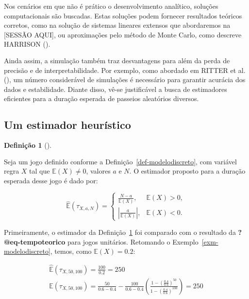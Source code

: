 \documentclass[
  brazilian,
  12pt,
]{article}
\theoremstyle{definition}
\theoremstyle{definition}
\newtheorem{definition}{Definição}[section]
\theoremstyle{remark}
\begin{document}
Nos cenários em que não é prático o desenvolvimento analítico, soluções
computacionais são buscadas. Estas soluções podem fornecer resultados
teóricos corretos, como na solução de sistemas lineares extensos que
abordaremos na {[}SESSÃO AQUI{]}, ou aproximações pelo método de Monte
Carlo, como descreve HARRISON
().

Ainda assim, a simulação também traz desvantagens para além da perda de
precisão e de interpretabilidade. Por exemplo, como abordado em RITTER
et al. (), um número
considerável de simulações é necessário para garantir acurácia dos dados
e estabilidade. Diante disso, vê-se justificável a busca de estimadores
eficientes para a duração esperada de passeios aleatórios diversos.

\subsection{Um estimador heurístico}\label{um-estimador-heuruxedstico}

\begin{definition}[]\protect\hypertarget{def-estimadorsimples}{}\label{def-estimadorsimples}

Seja um jogo definido conforme a Definição~\ref{def-modelodiscreto}, com
variável regra \(X\) tal que \(\mathbb{E}(X) \neq 0\), valores \(a\) e
\(N\). O estimador proposto para a duração esperada desse jogo é dado
por:

\[
\hat{\mathbb{E}}(\tau_{X, a, N}) = \begin{cases}
\frac{N-a}{\mathbb{E}(X)},  & \mathbb{E}(X) > 0, \\
\left \lvert \frac{a}{\mathbb{E}(X)} \right \rvert,  & \mathbb{E}(X) < 0.
\end{cases}
\]

\end{definition}

Primeiramente, o estimador da Definição~\ref{def-estimadorsimples} foi
comparado com o resultado da \textbf{?@eq-tempoteorico} para jogos
unitários. Retomando o Exemplo~\ref{exm-modelodiscreto}, temos, como
\(\mathbb{E}(X) = 0.2\):

\[
\begin{aligned}
\hat{\mathbb{E}}(\tau_{X, 50, 100}) = \frac{100}{0.2} = 250 \\
\mathbb{E}(\tau_{X, 50, 100}) = \frac{50}{0.6 - 0.4} - \frac{100}{0.6 - 0.4}
\left( \frac{1 - \left( \frac{0.4}{0.6} \right)^{50}}{1 - \left( \frac{0.4}{0.6}
\right)^{100}} \right) = 250
\end{aligned}
\]
\end{document}

